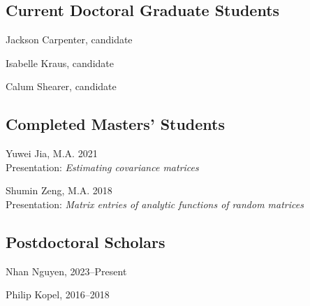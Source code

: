 \documentclass[letterpaper]{article}
\renewenvironment{itemize}{
  \begin{list}{}{
    \setlength{\leftmargin}{1em}
  }
}{
  \end{list}
}
\begin{document}
	
\subsection*{Current Doctoral Graduate Students}
\begin{itemize}
	\item Jackson Carpenter, candidate
	\item Isabelle Kraus, candidate
	\item Calum Shearer, candidate 
\end{itemize}

\subsection*{Completed Masters' Students}
\begin{itemize}
	\item Yuwei Jia, M.A. 2021 \\
	Presentation: \textit{Estimating covariance matrices} 
	\item Shumin Zeng, M.A. 2018 \\
	Presentation: \textit{Matrix entries of analytic functions of random matrices}
\end{itemize}


\subsection*{Postdoctoral Scholars}
\begin{itemize}
	\item Nhan Nguyen, 2023--Present
	\item Philip Kopel, 2016--2018
\end{itemize}
\end{document}
